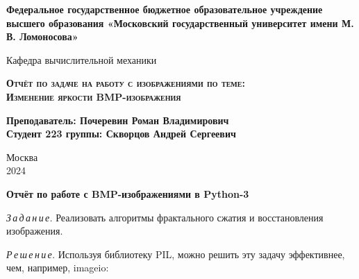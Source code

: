 \documentclass{article}
\begin{document}
\begin{titlepage}
	\newpage
	
	\begin{center}
		\textbf{Федеральное государственное бюджетное образовательное учреждение высшего образования «Московский государственный университет имени М. В. Ломоносова»}\\
	\end{center}
	
	\vspace{8em}
	
	\begin{center}
		\Large Кафедра вычислительной механики \\ 
	\end{center}
	
	\vspace{2em}
	
	\begin{center}
		\Large \textsc{\textbf{Отчёт по задаче на работу с изображениями по теме:}}
		\\
		\Large \textsc{\textbf{ Изменение яркости BMP-изображения \linebreak}}
	\end{center}
	
	\vspace{15em}
	
	
	
	\begin{flushright}
		\small
		\textbf{Преподаватель: Почеревин Роман Владимирович}\\
		\textbf{Студент 223 группы: Скворцов Андрей Сергеевич}\\
	\end{flushright}
	
	
	\vspace{\fill}
	
	\begin{center}
		Москва \\2024
	\end{center}
	
\end{titlepage}

\begin{center}


{\large\bf Отчёт по работе с BMP-изображениями в Python-3}
\end{center}
\textit{З\,а\,д\,а\,н\,и\,е.} Реализовать алгоритмы фрактального сжатия и восстановления изображения.

 
\textit{Р\,е\,ш\,е\,н\,и\,е.}  Используя библиотеку PIL, можно решить эту задачу эффективнее, чем, например, imageio:
\end{document}
